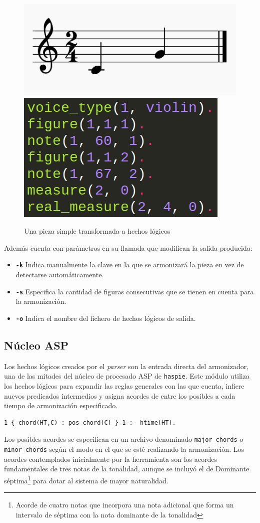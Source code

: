 \begin{figure}[h]
	\centering
	\includegraphics[width=0.4\linewidth]{imagenes/example_notes.png}
	\includegraphics[width=0.3\linewidth]{imagenes/logic_facts_score.png}
	\caption{Una pieza simple transformada a hechos lógicos}
	\label{fig:simple-piece-facts}
\end{figure}

Además cuenta con parámetros en su llamada que modifican la salida producida:
\begin{itemize}
	\item \textbf{\texttt{-k}} Indica manualmente la clave en la que se armonizará la pieza en vez de detectarse automáticamente.
	\item \textbf{\texttt{-s}} Especifica la cantidad de figuras consecutivas que se tienen en cuenta para la armonización.
	\item \textbf{\texttt{-o}} Indica el nombre del fichero de hechos lógicos de salida.
\end{itemize}

\subsection{Núcleo ASP}
Los hechos lógicos creados por el \textit{parser} son la entrada directa del armonizador, una de las mitades del núcleo de procesado ASP de \texttt{haspie}.
Este módulo utiliza los hechos lógicos para expandir las reglas generales con las que cuenta, infiere nuevos predicados intermedios y asigna acordes de entre los posibles a cada tiempo de armonización especificado.
\begin{Verbatim}[frame=single]
1 { chord(HT,C) : pos_chord(C) } 1 :- htime(HT).
\end{Verbatim}
 Los posibles acordes se especifican en un archivo denominado \texttt{major\_chords} o \texttt{minor\_chords} según el modo en el que se esté realizando la armonización. Los acordes contemplados inicialmente por la herramienta son los acordes fundamentales de tres notas de la tonalidad, aunque se incluyó el de Dominante séptima\footnote{Acorde de cuatro notas que incorpora una nota adicional que forma un intervalo de séptima con la nota dominante de la tonalidad} para dotar al sistema de mayor naturalidad.

